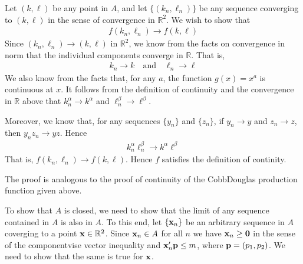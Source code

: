 \documentclass[letterpaper,10pt,english]{jupyterBook}
\begin{document}
\sphinxAtStartPar
Let \((k, \ell)\) be any point in \(A\), and let \(\{(k_n, \ell_n)\}\) be any
sequence converging to \((k, \ell)\) in the sense of convergence in \(\mathbb{R}^2\). We wish to show that
\begin{equation*}
\begin{split}
f(k_n, \ell_n) \to f(k, \ell)
\end{split}
\end{equation*}
\sphinxAtStartPar
Since \((k_n, \ell_n) \to (k, \ell)\) in \(\mathbb{R}^2\), we know from the facts on
convergence in norm that the individual components converge in \(\mathbb{R}\).
That is,
\begin{equation*}
\begin{split}
k_n \to k
\quad \text{and} \quad
\ell_n \to \ell
\end{split}
\end{equation*}
\sphinxAtStartPar
We also know from the facts that, for any \(a\), the function \(g(x) = x^a\)
is continuous at \(x\). It follows from the definition of continuity and
the convergence in \(\mathbb{R}\) above that \(k_n^\alpha \to k^{\alpha}\) and \(\ell^{\beta}_n \to
\ell^\beta\).

\sphinxAtStartPar
Moreover, we know that, for any sequences \(\{y_n\}\) and
\(\{z_n\}\), if \(y_n \to y\) and \(z_n \to z\), then \(y_n z_n \to yz\). Hence
\begin{equation*}
\begin{split}
    k_n^\alpha \ell^{\beta}_n \to k^{\alpha}\ell^\beta
\end{split}
\end{equation*}
\sphinxAtStartPar
That is, \(f(k_n, \ell_n) \to f(k, \ell)\). Hence \(f\) satisfies the
definition of continity.

\sphinxAtStartPar
{}

\sphinxAtStartPar
The proof is analogous to the proof of continuity of the Cobb\sphinxhyphen{}Douglas
production function given above.

\sphinxAtStartPar
{}

\sphinxAtStartPar
To show that \(A\) is closed, we need to show that the limit of any sequence
contained in \(A\) is also in \(A\). To this end,
let \(\{{\bf x}_n\}\) be an arbitrary sequence in \(A\) coverging to a point
\({\bf x} \in \mathbb{R}^2\).
Since \({\bf x}_n \in A\) for all \(n\) we have
\({\bf x}_n \geq {\bf 0}\) in the sense of the component\sphinxhyphen{}vise vector inequality
and \({\bf x}_n' {\bf p} \leq m\), where \({\bf p} = (p_1, p_2)\).
We need to show that the same is true for \({\bf x}\).
\end{document}
